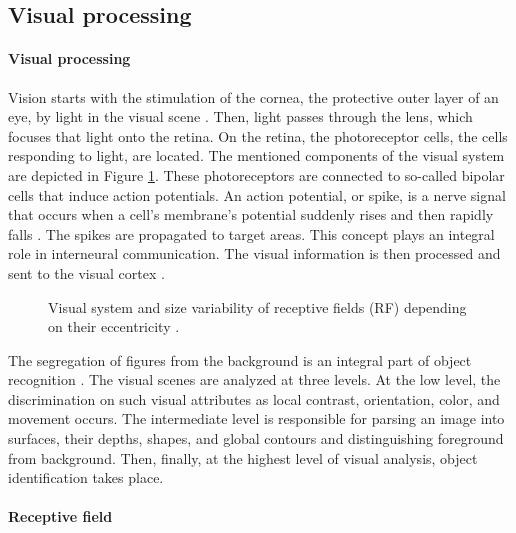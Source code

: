 \subsection{Visual processing}

\paragraph{Visual processing}

Vision starts with the stimulation of the cornea, the protective outer layer of an eye, by light in the visual scene \cite{KandelBook2003:26}. Then, light passes through the lens, which focuses that light onto the retina. On the retina, the photoreceptor cells, the cells responding to light, are located. The mentioned components of the visual system are depicted in Figure \ref{fig:receptive-field}. These photoreceptors are connected to so-called bipolar cells that induce action potentials. An action potential, or spike, is a nerve signal that occurs when a cell's membrane's potential suddenly rises and then rapidly falls \cite{IzhikevichBook2004:2}. The spikes are propagated to target areas. This concept plays an integral role in interneural communication.
The visual information is then processed and sent to the visual cortex \cite{KandelBook2003:26}.

\begin{figure}[!htp]
    \centering
    
    \caption{Visual system and size variability of receptive fields (RF) depending on their eccentricity \cite{KandelBook2003:25}.}
    \label{fig:receptive-field}
\end{figure}

The segregation of figures from the background is an integral part of object recognition \cite{KandelBook2003:25}. The visual scenes are analyzed at three levels. At the low level, the discrimination on such visual attributes as local contrast, orientation, color, and movement occurs. The intermediate level is responsible for parsing an image into surfaces, their depths, shapes, and global contours and distinguishing foreground from background. Then, finally, at the highest level of visual analysis, object identification takes place.


\paragraph{Receptive field}


